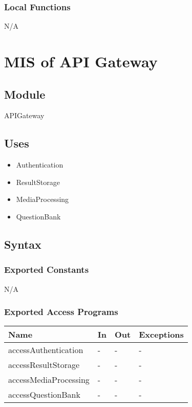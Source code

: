 \documentclass[12pt, titlepage]{article}
\begin{document}
\subsubsection{Local Functions}
N/A

\section{MIS of API Gateway \label{mAppGateway} }

\subsection{Module}

APIGateway

\subsection{Uses}

\begin{itemize}
  \item Authentication
  \item ResultStorage
  \item MediaProcessing
  \item QuestionBank
\end{itemize}

\subsection{Syntax}

\subsubsection{Exported Constants}

N/A

\subsubsection{Exported Access Programs}

\begin{center}
\begin{tabular}{p{8cm} p{4cm} p{2cm} p{2cm}}
\hline
\textbf{Name} & \textbf{In} & \textbf{Out} & \textbf{Exceptions} \\
\hline
accessAuthentication & - & - & - \\
accessResultStorage & - & - & - \\
accessMediaProcessing & - & - & - \\
accessQuestionBank & - & - & - \\
\hline
\end{tabular}
\end{center}
\end{document}
